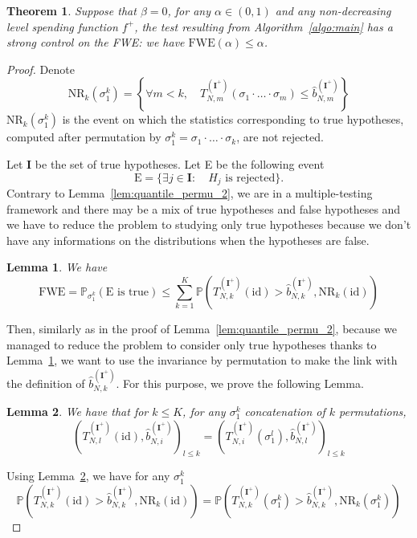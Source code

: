 \documentclass{article}
\theoremstyle{plain}
\newtheorem{Theorem}{Theorem}
\newtheorem{Lemma}{Lemma}
\theoremstyle{remark}
\renewcommand{\P}{\mathbb{P}}
\newcommand{\1}{\mathbbm{1}}
\newcommand{\id}{\mathrm{id}}
\numberwithin{equation}{section}
\begin{document}
\begin{Theorem}\label{th:multi_FWE}
Suppose that $\beta = 0$, for any $\alpha \in (0,1)$ and any non-decreasing level spending function $f^+$, the test resulting from Algorithm~\ref{algo:main} has a strong control on the FWE: we have $\mathrm{FWE}(\alpha)\le\alpha$.
\end{Theorem}
\begin{proof}
Denote 
$$\mathrm{NR}_k(\sigma_1^k) = \left\{\forall m < k,\quad  T_{N,m}^{(\textbf{I}^+)}(\sigma_1\cdot\ldots\cdot\sigma_m) \le   \widehat{b}_{N,m}^{(\textbf{I}^+)}\right\}$$
$\mathrm{NR}_k(\sigma_1^k)$ is the event on which the statistics corresponding to true hypotheses, computed after permutation by $\sigma_1^k=\sigma_1\cdot \ldots \cdot \sigma_k$, are not rejected.


Let $\textbf{I}$ be the set of true hypotheses. Let E be the following event
$$\mathrm{E}= \{ \exists j \in \textbf{I}: \quad H_j \text{ is rejected}\}.$$
Contrary to Lemma~\ref{lem:quantile_permu_2}, we are in a multiple-testing framework and there may be a mix of true hypotheses and false hypotheses and we have to reduce the problem to studying only true hypotheses because we don't have any informations on the distributions when the hypotheses are false.
\begin{Lemma}\label{lem:multiple_test_FWE}
We have 
$$\mathrm{FWE} = \P_{\sigma_1^k}\left(\mathrm{E}\text{ is true} \right) \le \sum_{k=1}^K\P\left( T_{N,k}^{(\textbf{I}^+)}(\id) > \widehat{b}_{N,k}^{(\textbf{I}^+)}, \mathrm{NR}_k(\id)\right)  $$
\end{Lemma}
Then, similarly as in the proof of Lemma~\ref{lem:quantile_permu_2}, because we managed to reduce the problem to consider only true hypotheses thanks to Lemma~\ref{lem:multiple_test_FWE}, we want to use the invariance by permutation to make the link with the definition of $\widehat{b}_{N,k}^{(\textbf{I}^+)}$. For this purpose, we prove the following Lemma.


\begin{Lemma}\label{lem:invariance}
We have that for $k \le K$, for any ${\sigma_1^k}$ concatenation of $k$ permutations, 
$$(T_{N,l}^{(\textbf{I}^+)}(\id),\widehat{b}_{N,i}^{(\textbf{I}^+)})_{l\le k}=(T_{N,i}^{(\textbf{I}^+)}(\sigma_1^l), \widehat{b}_{N,l}^{(\textbf{I}^+)})_{l\le k}$$
\end{Lemma}
Using Lemma~\ref{lem:invariance}, we have for any ${\sigma_1^k}$
$$\P\left(T_{N,k}^{(\textbf{I}^+)}(\id) > \widehat{b}_{N,k}^{(\textbf{I}^+)}, \mathrm{NR}_k(\id ) \right) = \P\left(T_{N,k}^{(\textbf{I}^+)}({\sigma_1^k}) > \widehat{b}_{N,k}^{(\textbf{I}^+)}, \mathrm{NR}_k({\sigma_1^k}) \right)$$


\end{proof}
\end{document}
